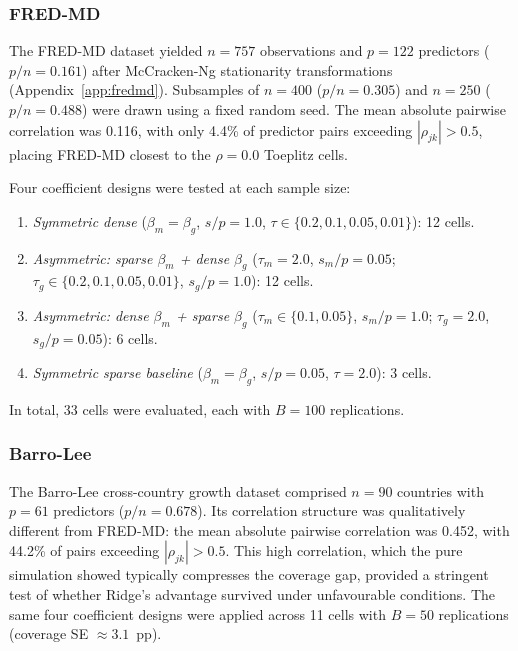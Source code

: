\documentclass[a4paper,10.5pt]{article}
\begin{document}
\subsubsection*{FRED-MD}

The FRED-MD dataset \citep{mccracken2016} yielded $n = 757$ observations and $p = 122$ predictors ($p/n = 0.161$) after McCracken-Ng stationarity transformations (Appendix~\ref{app:fredmd}). Subsamples of $n = 400$ ($p/n = 0.305$) and $n = 250$ ($p/n = 0.488$) were drawn using a fixed random seed. The mean absolute pairwise correlation was 0.116, with only 4.4\% of predictor pairs exceeding $|\rho_{jk}| > 0.5$, placing FRED-MD closest to the $\rho = 0.0$ Toeplitz cells.

Four coefficient designs were tested at each sample size:
\begin{enumerate}[label=(\roman*)]
    \item \textit{Symmetric dense} ($\beta_m = \beta_g$, $s/p = 1.0$, $\tau \in \{0.2, 0.1, 0.05, 0.01\}$): 12 cells.
    \item \textit{Asymmetric: sparse $\beta_m$ + dense $\beta_g$} ($\tau_m = 2.0$, $s_m/p = 0.05$; $\tau_g \in \{0.2, 0.1, 0.05, 0.01\}$, $s_g/p = 1.0$): 12 cells.
    \item \textit{Asymmetric: dense $\beta_m$ + sparse $\beta_g$} ($\tau_m \in \{0.1, 0.05\}$, $s_m/p = 1.0$; $\tau_g = 2.0$, $s_g/p = 0.05$): 6 cells.
    \item \textit{Symmetric sparse baseline} ($\beta_m = \beta_g$, $s/p = 0.05$, $\tau = 2.0$): 3 cells.
\end{enumerate}
In total, 33 cells were evaluated, each with $B = 100$ replications.

\subsubsection*{Barro-Lee}

The Barro-Lee cross-country growth dataset \citep{barro1994} comprised $n = 90$ countries with $p = 61$ predictors ($p/n = 0.678$). Its correlation structure was qualitatively different from FRED-MD: the mean absolute pairwise correlation was 0.452, with 44.2\% of pairs exceeding $|\rho_{jk}| > 0.5$. This high correlation, which the pure simulation showed typically compresses the coverage gap, provided a stringent test of whether Ridge's advantage survived under unfavourable conditions. The same four coefficient designs were applied across 11 cells with $B = 50$ replications (coverage SE $\approx 3.1$~pp).
\end{document}

